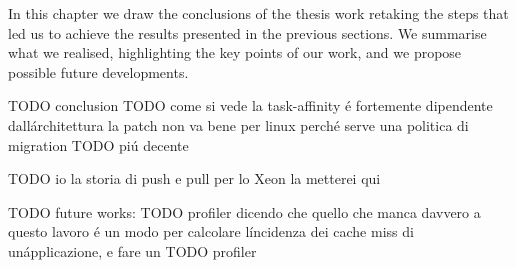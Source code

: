 In this chapter we draw the conclusions of the thesis work retaking the steps that led us to achieve the results presented in the previous sections.
We summarise what we realised, highlighting the key points of our work, and we propose possible future developments.

TODO conclusion
TODO come si vede la task-affinity \'e fortemente dipendente dall\'architettura la patch non va bene per linux perch\'e serve una politica di migration
TODO pi\'u decente

TODO io la storia di push e pull per lo Xeon la metterei qui

TODO future works:
TODO profiler dicendo che quello che manca davvero a questo lavoro \'e un modo per calcolare l\'incidenza dei cache miss di un\'applicazione, e fare un 
TODO profiler 



